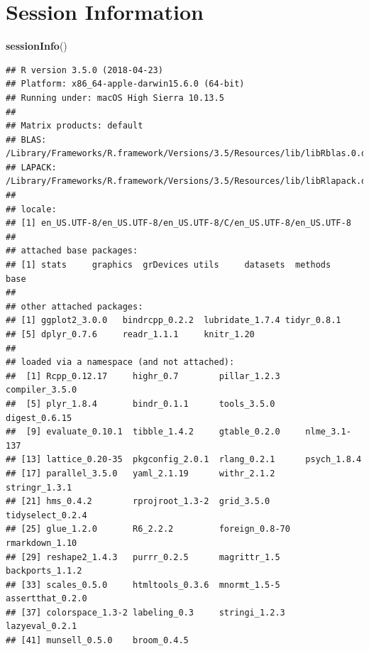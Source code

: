 \documentclass[]{article}
\newenvironment{Shaded}{\begin{snugshade}}{\end{snugshade}}
\newcommand{\KeywordTok}[1]{\textcolor[rgb]{0.13,0.29,0.53}{\textbf{#1}}}
\newcommand{\NormalTok}[1]{#1}
\begin{document}
\section{Session Information}\label{session-information}

\begin{Shaded}
\begin{Highlighting}[]
\KeywordTok{sessionInfo}\NormalTok{()}
\end{Highlighting}
\end{Shaded}

\begin{verbatim}
## R version 3.5.0 (2018-04-23)
## Platform: x86_64-apple-darwin15.6.0 (64-bit)
## Running under: macOS High Sierra 10.13.5
## 
## Matrix products: default
## BLAS: /Library/Frameworks/R.framework/Versions/3.5/Resources/lib/libRblas.0.dylib
## LAPACK: /Library/Frameworks/R.framework/Versions/3.5/Resources/lib/libRlapack.dylib
## 
## locale:
## [1] en_US.UTF-8/en_US.UTF-8/en_US.UTF-8/C/en_US.UTF-8/en_US.UTF-8
## 
## attached base packages:
## [1] stats     graphics  grDevices utils     datasets  methods   base     
## 
## other attached packages:
## [1] ggplot2_3.0.0   bindrcpp_0.2.2  lubridate_1.7.4 tidyr_0.8.1    
## [5] dplyr_0.7.6     readr_1.1.1     knitr_1.20     
## 
## loaded via a namespace (and not attached):
##  [1] Rcpp_0.12.17     highr_0.7        pillar_1.2.3     compiler_3.5.0  
##  [5] plyr_1.8.4       bindr_0.1.1      tools_3.5.0      digest_0.6.15   
##  [9] evaluate_0.10.1  tibble_1.4.2     gtable_0.2.0     nlme_3.1-137    
## [13] lattice_0.20-35  pkgconfig_2.0.1  rlang_0.2.1      psych_1.8.4     
## [17] parallel_3.5.0   yaml_2.1.19      withr_2.1.2      stringr_1.3.1   
## [21] hms_0.4.2        rprojroot_1.3-2  grid_3.5.0       tidyselect_0.2.4
## [25] glue_1.2.0       R6_2.2.2         foreign_0.8-70   rmarkdown_1.10  
## [29] reshape2_1.4.3   purrr_0.2.5      magrittr_1.5     backports_1.1.2 
## [33] scales_0.5.0     htmltools_0.3.6  mnormt_1.5-5     assertthat_0.2.0
## [37] colorspace_1.3-2 labeling_0.3     stringi_1.2.3    lazyeval_0.2.1  
## [41] munsell_0.5.0    broom_0.4.5
\end{verbatim}
\end{document}
